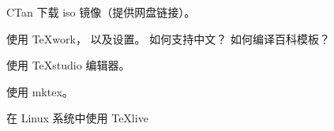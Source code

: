 
\begin{issues}
\issueTODO
\end{issues}

CTan 下载 iso 镜像（提供网盘链接）。

使用 TeXwork， 以及设置。 如何支持中文？ 如何编译百科模板？

使用 TeXstudio 编辑器。

使用 mktex。

在 Linux 系统中使用 TeXlive
